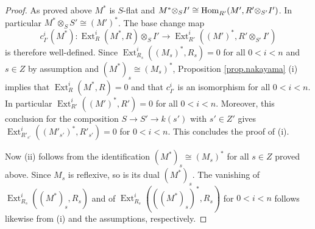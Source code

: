 \documentclass[a4paper,10pt]{amsart}
\theoremstyle{plain}
\theoremstyle{definition}
\theoremstyle{remark}
\numberwithin{equation}{xx}
\DeclareMathOperator{\Ext}{Ext}
\DeclareMathOperator{\Hom}{Hom}
\newcommand{\co}{\colon}
\newcommand{\ra}{\rightarrow}
\newcommand{\lra}{\longrightarrow}
\newcommand{\ot}{{\otimes}}
\newcommand{\hm}[4]{{\Hom}_{#2}^{#1}({#3},{#4})}
\newcommand{\xt}[4]{{\Ext} _{#2}^{#1}({#3},{#4})}
\begin{document}
\begin{proof}
As proved above \(M^{*}\) is \(S\)-flat and \(M^{*}\ot_{S}I'\linebreak[1]\cong \hm{}{R'}{M'}{R'\ot_{S'}I'}\). In particular \(M^{*}\ot_{S}S'\cong (M')^{*}\). The base change map
\begin{equation}\label{eq.bcS}
c^{i}_{I'}(M^{*})\co \xt{i}{R}{M^{*}}{R}\ot_{S}I'\lra\xt{i}{R'}{(M')^{*}}{R'\ot_{S'} I'}
\end{equation}
is therefore well-defined. Since \(\xt{i}{R_{s}}{(M_{s})^{*}}{R_{s}}=0\) for all \(0<i<n\) and \(s\in Z\) by assumption and \((M^{*})_{s}\cong (M_{s})^{*}\), Proposition \ref{prop.nakayama} (i) implies that \(\xt{i}{R}{M^{*}}{R}=0\) and that \(c^{i}_{I'}\) is an isomorphism for all \(0<i<n\). In particular \(\xt{i}{R'}{(M')^{*}}{R'}=0\) for all \(0<i<n\). Moreover, this conclusion for the composition \(S\ra S'\ra k(s')\) with \(s'\in Z'\) gives
\(\xt{i}{{R'\!\!}_{s'}}{({M'\!\!}_{s'})^{*}}{{R'\!}_{s'}}=0\) for \(0<i<n\). This concludes the proof of (i).

Now (ii) follows from the identification \((M^{*})_{s}\cong (M_{s})^{*}\) for all \(s\in Z\) proved above. Since \(M_{s}\) is reflexive, so is its dual \((M^{*})_{s}\). The vanishing of \(\xt{i}{R_{s}}{(M^{*})_{s}}{R_{s}}\) and of \(\xt{i}{R_{s}}{((M^{*})_{s})^{*}}{R_{s}}\) for \(0<i<n\) follows likewise from (i) and the assumptions, respectively.
\end{proof}
\end{document}
